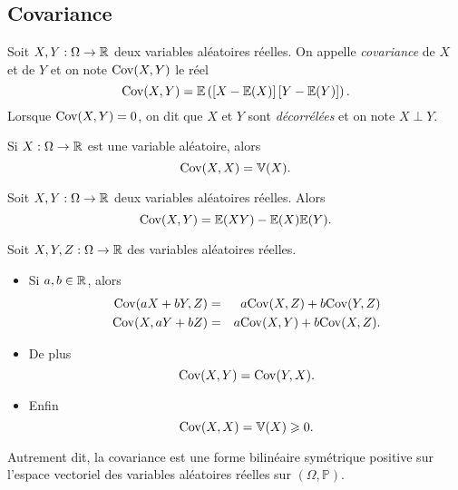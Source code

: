 \documentclass{magnolia}
\begin{document}
\subsection{Covariance}

\begin{definition}
Soit $X,Y:\Omega\to\R$ deux variables aléatoires réelles. On appelle \emph{covariance} de $X$ et
de $Y$ et on note ${\rm Cov}(X,Y)$ le réel
\[{\rm Cov}(X,Y)=\mathbb{E}\p{\cro{X-\mathbb{E}(X)}\cro{Y-\mathbb{E}(Y)}}.\]
Lorsque ${\rm Cov}(X,Y)=0$, on dit que $X$ et $Y$ sont \emph{décorrélées} et on note $X\perp Y$.
\end{definition}

\begin{remarqueUnique}
\remarque Si $X:\Omega\to\R$ est une variable aléatoire, alors
  \[{\rm Cov}(X,X)=\mathbb{V}(X).\]
\end{remarqueUnique}

\begin{proposition}
Soit $X,Y:\Omega\to\R$ deux variables aléatoires réelles. Alors
\[{\rm Cov}(X,Y)=\mathbb{E}(XY)-\mathbb{E}(X)\mathbb{E}(Y).\]
\end{proposition}

\begin{proposition}
Soit $X,Y,Z:\Omega\to\R$ des variables aléatoires réelles.
\begin{itemize}
\item Si $a,b\in\R$, alors
  \begin{eqnarray*}
{\rm Cov}(aX+bY,Z)&=&a{\rm Cov}(X,Z)+b{\rm Cov}(Y,Z)\\
{\rm Cov}(X,aY+bZ)&=&a{\rm Cov}(X,Y)+b{\rm Cov}(X,Z).
  \end{eqnarray*}
\item De plus
  \[{\rm Cov}(X,Y)={\rm Cov}(Y,X).\]
\item Enfin
  \[{\rm Cov}(X,X)=\mathbb{V}(X)\geq 0.\]
\end{itemize}
Autrement dit, la covariance est une forme bilinéaire symétrique positive sur l'espace
vectoriel des variables aléatoires réelles sur $(\Omega,\mathbb{P})$.
\end{proposition}
\end{document}
